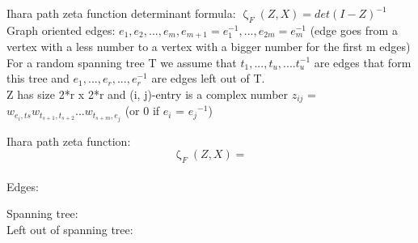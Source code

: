 \documentclass[12pt]{extarticle}
\begin{document}
Ihara path zeta function determinant formula: $\upzeta_F(Z, X) = det(I-Z)^{-1}$\\
Graph oriented edges: $e_{1}, e_{2}, ... , e_{m}, e_{m+1}=e_{1}^{-1}, ... , e_{2m}=e_{m}^{-1}$ (edge goes from a vertex with a less number to a vertex with a bigger number for the first m edges) \\
For a random spanning tree T we assume that $t_{1}, ..., t_{u}, .... t_{u}^{-1}$ are edges that form this tree and $e_{1}, ..., e_{r}, ..., e_{r}^{-1}$ are edges left out of T. \\
Z has size 2*r x 2*r and (i, j)-entry is a complex number $z_{ij}$ = $w_{e_{i}, t{s}}w_{t_{s+1}, t_{s+2}}...w_{t_{s+m}, e_{j}}$ (or 0 if $e_{i}$ = ${e_j}^{-1}$)

\bigskip
Ihara path zeta function: $$\upzeta_F(Z, X) = $$ \\

Edges:

Spanning tree:
\\

Left out of spanning tree:
\end{document}
